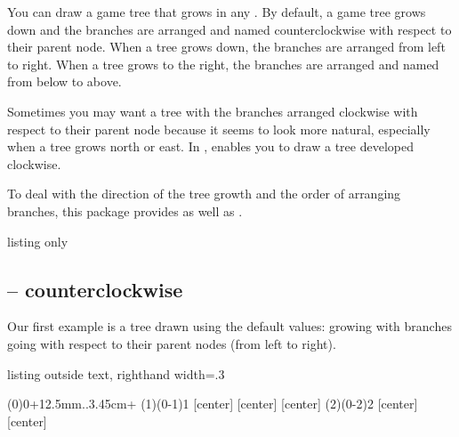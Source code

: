 You can draw a game tree that grows in any .
By default, a game tree grows down and the  branches are arranged and named counterclockwise with respect to their parent node.
When a tree grows down, the branches are arranged from left to right.
When a tree grows to the right, the branches are arranged and named from below to above.

Sometimes you may want a tree with the branches arranged clockwise with respect to their parent node because it seems to look more natural, especially when a tree grows north or east.
In \TikZ,  enables you to draw a tree developed clockwise.

To deal with the direction of the tree growth and the order of arranging branches, this package provides  as well as  \icmd{\setistgrowdirection}.

\begin{tcblisting}{listing only}
  \def\xtgrow{grow}
  \def\istdefault@grow{south} %

  \NewDocumentCommand{}
  {
    { \renewcommand\xtgrow{grow'}
      \renewcommand\istdefault@grow{#2}
    }
    { \renewcommand\xtgrow{grow}
      \renewcommand\istdefault@grow{#2}
    }
  }
\end{tcblisting}


\subsection{\protect\cmd{\setistgrowdirection} -- counterclockwise}

Our first example is a tree drawn using the default values: growing  with branches going  with respect to their parent nodes (from left to right).

\begin{tcblisting}{listing outside text, righthand width=.3\linewidth}
\begin{istgame}
\setistOvalNodeStyle{.6cm}
\istrooto(0){0}+{12.5mm}..{3.45cm}+
  \istb  \istb  \endist
\xtdistance{12.5mm}{11.5mm}
\istrooto(1)(0-1){1}
  [center]  [center]
  [center]  \endist
\istrooto(2)(0-2){2}
  [center]  [center]  \endist
\end{istgame}
\end{tcblisting}

